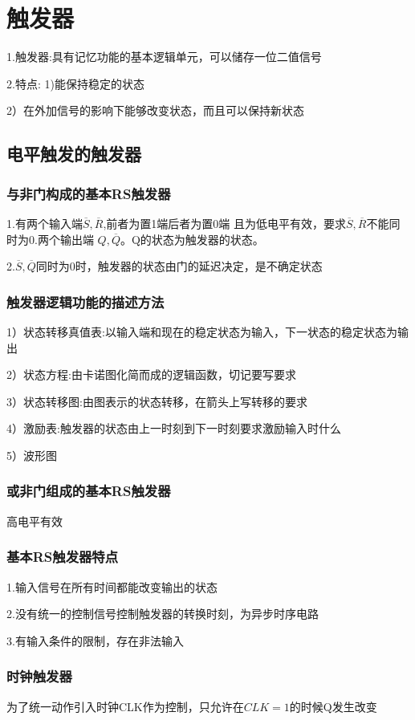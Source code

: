 \documentclass[11pt,twoside,a4paper]{ctexart}
\begin{document}
    \section{触发器}
    1.触发器:具有记忆功能的基本逻辑单元，可以储存一位二值信号

    2.特点: 
     1)能保持稳定的状态

     2）在外加信号的影响下能够改变状态，而且可以保持新状态
    
    \subsection{电平触发的触发器}
    \subsubsection{与非门构成的基本RS触发器}
    1.有两个输入端$\overline{S},\overline{R}$,前者为置1端后者为置0端
    且为低电平有效，要求$\overline{S},\overline{R}$不能同时为0.两个输出端
    $Q,\overline{Q}$。Q的状态为触发器的状态。

    2.$\overline{S},\overline{Q}$同时为0时，触发器的状态由门的延迟决定，是不确定状态

    \subsubsection{触发器逻辑功能的描述方法}
    1）状态转移真值表:以输入端和现在的稳定状态为输入，下一状态的稳定状态为输出

    2）状态方程:由卡诺图化简而成的逻辑函数，切记要写要求

    3）状态转移图:由图表示的状态转移，在箭头上写转移的要求

    4）激励表:触发器的状态由上一时刻到下一时刻要求激励输入时什么

    5）波形图
    \subsubsection{或非门组成的基本RS触发器}
    高电平有效

    \subsubsection{基本RS触发器特点}
    1.输入信号在所有时间都能改变输出的状态
    
    2.没有统一的控制信号控制触发器的转换时刻，为异步时序电路

    3.有输入条件的限制，存在非法输入

    \subsubsection{时钟触发器}
    为了统一动作引入时钟CLK作为控制，只允许在$CLK = 1$的时候Q发生改变
\end{document}
